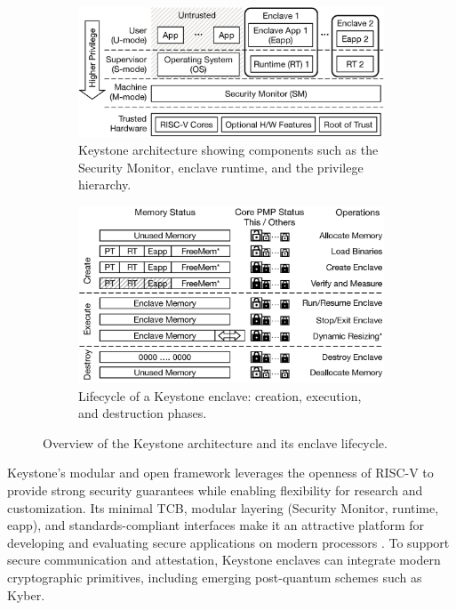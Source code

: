 \begin{figure}[htbp]
\centering
\begin{subfigure}[b]{0.9\linewidth}
    \centering
    \includegraphics[width=\linewidth]{figures/keystone_overview.png}
    \caption{Keystone architecture showing components such as the Security Monitor, enclave runtime, and the privilege hierarchy.}
    \label{fig:keystone_overview}
\end{subfigure}

\vspace{0.5cm}

\begin{subfigure}[b]{0.9\linewidth}
    \centering
    \includegraphics[width=\linewidth]{figures/enclave_lifecycle.png}
    \caption{Lifecycle of a Keystone enclave: creation, execution, and destruction phases.}
    \label{fig:enclave_lifecycle}
\end{subfigure}

\caption{Overview of the Keystone architecture and its enclave lifecycle.}
\label{fig:keystone_grouped}
\end{figure}

Keystone’s modular and open framework leverages the openness of RISC-V to provide strong security guarantees while enabling flexibility for research and customization. Its minimal TCB, modular layering (Security Monitor, runtime, eapp), and standards-compliant interfaces make it an attractive platform for developing and evaluating secure applications on modern processors \cite{dayeol2019keystone}. 
To support secure communication and attestation, Keystone enclaves can integrate modern cryptographic primitives, including emerging post-quantum schemes such as Kyber.

